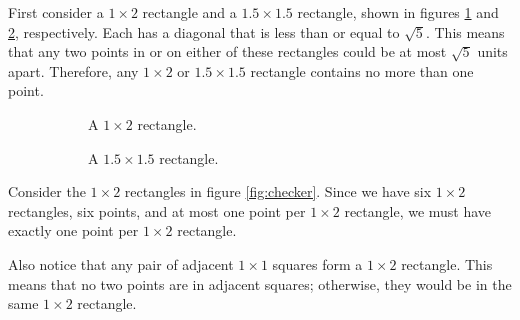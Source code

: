 \documentclass[12pt]{article}
\begin{document}
First consider a $1\times2$ rectangle and a $1.5\times1.5$ rectangle, shown in figures \ref{fig:rect-12} and \ref{fig:rect-15}, respectively. Each has a diagonal that is less than or equal to $\sqrt{5}$. This means that any two points in or on either of these rectangles could be at most $\sqrt{5}$ units apart. Therefore, any $1\times2$ or $1.5\times1.5$ rectangle contains no more than one point.

\begin{figure}[ht]
    \centering
    \begin{subfigure}[b]{.47\textwidth}
        \centering
        \caption{A $1\times2$ rectangle.}
        \label{fig:rect-12}
    \end{subfigure}
    \begin{subfigure}[b]{.47\textwidth}
        \centering
        \caption{A $1.5\times1.5$ rectangle.}
        \label{fig:rect-15}
    \end{subfigure}
    \caption{}
    \label{fig:small-rects}
\end{figure}

Consider the $1\times2$ rectangles in figure \ref{fig:checker}. Since we have six $1\times2$ rectangles, six points, and at most one point per $1\times2$ rectangle, we must have exactly one point per $1\times2$ rectangle.

Also notice that any pair of adjacent $1\times1$ squares form a $1\times2$ rectangle. This means that no two points are in adjacent squares; otherwise, they would be in the same $1\times2$ rectangle. 
\end{document}
